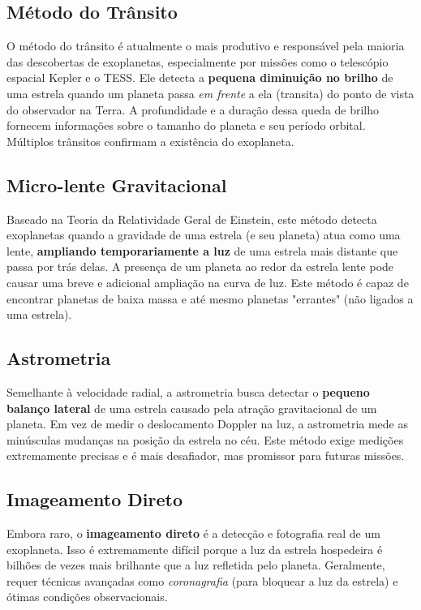 \documentclass{article}
\begin{document}
\subsection{Método do Trânsito}
O método do trânsito é atualmente o mais produtivo e responsável pela maioria das descobertas de exoplanetas, especialmente por missões como o telescópio espacial Kepler e o TESS. Ele detecta a \textbf{pequena diminuição no brilho} de uma estrela quando um planeta passa \textit{em frente} a ela (transita) do ponto de vista do observador na Terra. A profundidade e a duração dessa queda de brilho fornecem informações sobre o tamanho do planeta e seu período orbital. Múltiplos trânsitos confirmam a existência do exoplaneta.

\subsection{Micro-lente Gravitacional}
Baseado na Teoria da Relatividade Geral de Einstein, este método detecta exoplanetas quando a gravidade de uma estrela (e seu planeta) atua como uma lente, \textbf{ampliando temporariamente a luz} de uma estrela mais distante que passa por trás delas. A presença de um planeta ao redor da estrela lente pode causar uma breve e adicional ampliação na curva de luz. Este método é capaz de encontrar planetas de baixa massa e até mesmo planetas "errantes" (não ligados a uma estrela).

\subsection{Astrometria}
Semelhante à velocidade radial, a astrometria busca detectar o \textbf{pequeno balanço lateral} de uma estrela causado pela atração gravitacional de um planeta. Em vez de medir o deslocamento Doppler na luz, a astrometria mede as minúsculas mudanças na posição da estrela no céu. Este método exige medições extremamente precisas e é mais desafiador, mas promissor para futuras missões.

\subsection{Imageamento Direto}
Embora raro, o \textbf{imageamento direto} é a detecção e fotografia real de um exoplaneta. Isso é extremamente difícil porque a luz da estrela hospedeira é bilhões de vezes mais brilhante que a luz refletida pelo planeta. Geralmente, requer técnicas avançadas como \textit{coronagrafia} (para bloquear a luz da estrela) e ótimas condições observacionais.
\end{document}
